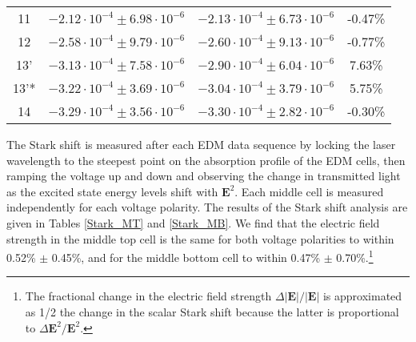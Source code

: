 \documentclass [10pt, twoside] {uwthesis}[2012/04/02]
\begin{document}
\begin{table}
\begin{center}
\begin{tabular}{cccc}
11  & $-2.12 \cdot 10^{-4} \pm 6.98 \cdot 10^{-6}$ & $-2.13 \cdot 10^{-4} \pm 6.73 \cdot 10^{-6}$ & -0.47\% \\
12  & $-2.58 \cdot 10^{-4} \pm 9.79 \cdot 10^{-6}$ & $-2.60 \cdot 10^{-4} \pm 9.13 \cdot 10^{-6}$ & -0.77\% \\
13' & $-3.13 \cdot 10^{-4} \pm 7.58 \cdot 10^{-6}$ & $-2.90 \cdot 10^{-4} \pm 6.04 \cdot 10^{-6}$ & 7.63\%  \\
13'*& $-3.22 \cdot 10^{-4} \pm 3.69 \cdot 10^{-6}$ & $-3.04 \cdot 10^{-4} \pm 3.79 \cdot 10^{-6}$ & 5.75\%  \\
14  & $-3.29 \cdot 10^{-4} \pm 3.56 \cdot 10^{-6}$ & $-3.30 \cdot 10^{-4} \pm 2.82 \cdot 10^{-6}$ & -0.30\% \\
\hline
\end{tabular}			
\end{center}										
\end{table}

The Stark shift is measured after each EDM data sequence by locking the laser wavelength to the steepest point on the absorption profile of the EDM cells, then ramping the voltage up and down and observing the change in transmitted light as the excited state energy levels shift with $\mathbf{E}^2$. Each middle cell is measured independently for each voltage polarity. The results of the Stark shift analysis are given in Tables \ref{Stark_MT} and \ref{Stark_MB}. We find that the electric field strength in the middle top cell is the same for both voltage polarities to within 0.52\% $\pm$ 0.45\%, and for the middle bottom cell to within 0.47\% $\pm$ 0.70\%.\footnote{The fractional change in the electric field strength $\Delta|\mathbf{E}|/|\mathbf{E}|$ is approximated as 1/2 the change in the scalar Stark shift because the latter is proportional to $\Delta\mathbf{E}^2/\mathbf{E}^2$. } 
\end{document}
